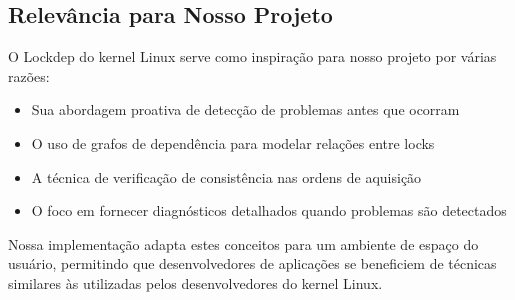 \subsection{Relevância para Nosso Projeto}

O Lockdep do kernel Linux serve como inspiração para nosso projeto por várias razões:

\begin{itemize}
    \item Sua abordagem proativa de detecção de problemas antes que ocorram
    \item O uso de grafos de dependência para modelar relações entre locks
    \item A técnica de verificação de consistência nas ordens de aquisição
    \item O foco em fornecer diagnósticos detalhados quando problemas são detectados
\end{itemize}

Nossa implementação adapta estes conceitos para um ambiente de espaço do usuário, permitindo que desenvolvedores de aplicações se beneficiem de técnicas similares às utilizadas pelos desenvolvedores do kernel Linux.
